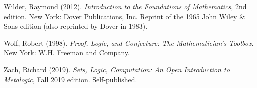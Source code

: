 \documentclass[../../../main.tex]{subfiles}
\begin{document}
\begin{thebibliography}{99}
  Wilder, Raymond (2012).
  \emph{Introduction to the Foundations of Mathematics}, 2nd edition.
  New York: Dover Publications, Inc. Reprint of the 1965 John Wiley \& Sons edition (also reprinted by Dover in 1983).

  Wolf, Robert (1998).
  \emph{Proof, Logic, and Conjecture: The Mathematician's Toolbox}.
  New York: W.H. Freeman and Company.

  Zach, Richard (2019).
  \emph{Sets, Logic, Computation: An Open Introduction to Metalogic}, Fall 2019 edition.
  Self-published.

\end{thebibliography}
\end{document}
